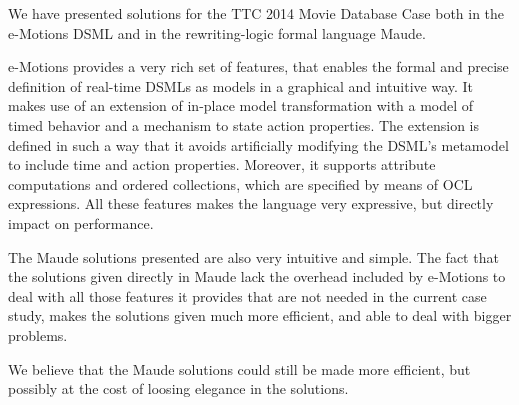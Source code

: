 
We have presented solutions for the TTC 2014 Movie Database Case both in the e-Motions DSML and in the rewriting-logic formal language Maude. 

e-Motions provides a very rich set of features, that enables the formal and precise definition of real-time DSMLs as models in a graphical and intuitive way. It makes use of an extension of in-place model transformation with a model of timed behavior and a mechanism to state action properties. The extension is defined in such a way that it avoids artificially modifying the DSML's metamodel to include time and action properties. Moreover, it supports attribute computations and ordered collections, which are specified by means of OCL
expressions. All these features makes the language very expressive, but directly impact on performance. 

The Maude solutions presented are also very intuitive and simple. The fact that the solutions given directly in Maude lack the overhead included by \mbox{e-Motions} to deal with all those features it provides that are not needed in the current case study, makes the solutions given much more efficient, and able to deal with bigger problems. 

We believe that the Maude solutions could still be made more efficient, but possibly at the cost of loosing elegance in the solutions. 